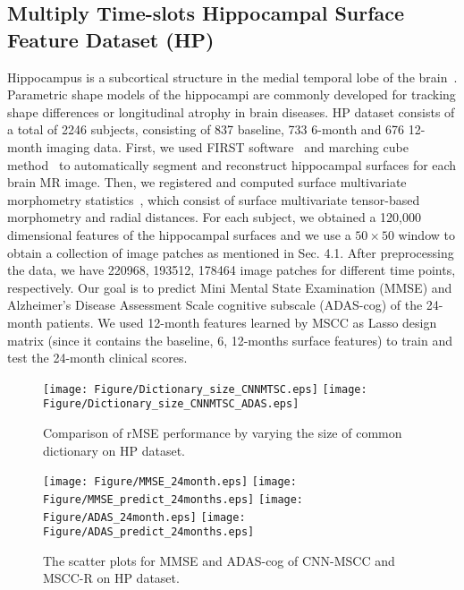 \documentclass[10pt,twocolumn,letterpaper]{article}
\begin{document}
\subsection{Multiply Time-slots Hippocampal Surface Feature Dataset (HP)}
\label{chap:HP}
Hippocampus is a subcortical structure in the medial temporal lobe of the brain~\cite{thompson2004mapping}. Parametric shape models of the hippocampi are commonly developed for tracking shape differences or longitudinal atrophy in brain diseases. HP dataset consists of a total of 2246 subjects, consisting of 837 baseline, 733 6-month and 676 12-month imaging data. First, we used FIRST software~\cite{patenaude2011bayesian} and marching cube method~\cite{lorensen1987marching} to automatically segment and reconstruct hippocampal surfaces for each brain MR image. Then, we registered and computed surface multivariate morphometry statistics~\cite{wang2011surface}, which consist of surface multivariate tensor-based morphometry and radial distances. For each subject, we obtained a 120,000 dimensional features of the hippocampal surfaces and we use a $50\times 50$ window to obtain a collection of image patches as mentioned in Sec. 4.1. After preprocessing the data, we have 220968, 193512, 178464 image patches for different time points, respectively. Our goal is to predict Mini Mental State Examination (MMSE) and Alzheimer's Disease Assessment Scale cognitive subscale (ADAS-cog) of the 24-month patients. We used 12-month features learned by MSCC as Lasso design matrix (since it contains the baseline, 6, 12-months surface features) to train and test the 24-month clinical scores.

\begin{figure}
\vspace{-1.3em}
\centering
\texttt{[image: Figure/Dictionary\_size\_CNNMTSC.eps]}
\texttt{[image: Figure/Dictionary\_size\_CNNMTSC\_ADAS.eps]}
\vspace{-0.5em}
\caption{Comparison of rMSE performance by varying the size of common dictionary on HP dataset.}
\label{fig:8}
\end{figure}

\begin{figure*}[t]
\vspace{-1.3em}
\centering
\texttt{[image: Figure/MMSE\_24month.eps]}
\texttt{[image: Figure/MMSE\_predict\_24months.eps]}
\texttt{[image: Figure/ADAS\_24month.eps]}
\texttt{[image: Figure/ADAS\_predict\_24months.eps]}
\vspace{-0.5em}
\caption{The scatter plots for MMSE and ADAS-cog of CNN-MSCC and MSCC-R on HP dataset.}
\label{fig:4}
\vspace{-1em}
\end{figure*}
\end{document}
